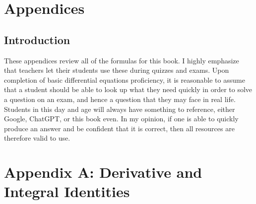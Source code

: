 

\newpage


\chapter*{Appendices}
\section*{Introduction}
These appendices review all of the formulas for this book. I highly emphasize that teachers let their students use these during quizzes and exams. Upon completion of basic differential equations proficiency, it is reasonable to assume that a student should be able to look up what they need quickly in order to solve a question on an exam, and hence a question that they may face in real life. Students in this day and age will always have something to reference, either Google, ChatGPT, or this book even. In my opinion, if one is able to quickly produce an answer and be confident that it is correct, then all resources are therefore valid to use.

\appendix
\pagestyle{appendix}


\chapter*{Appendix A: Derivative and Integral Identities}

